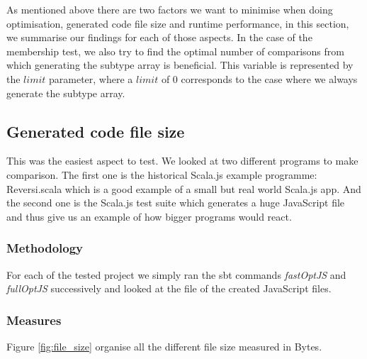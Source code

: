 As mentioned above there are two factors we want to minimise when doing
optimisation, generated code file size and runtime performance, in this
section, we summarise our findings for each of those aspects. In the case of
the membership test, we also try to find the optimal number of comparisons from
which generating the subtype array is beneficial. This variable is represented
by the $limit$ parameter, where a $limit$ of 0 corresponds to the case where we
always generate the subtype array.

\subsection{Generated code file size}
  This was the easiest aspect to test. We looked at two different programs to
make comparison. The first one is the historical Scala.js example programme:
Reversi.scala which is a good example of a small but real world Scala.js app.
And the second one is the Scala.js test suite which generates a huge JavaScript
file and thus give us an example of how bigger programs would react.

\subsubsection{Methodology}
For each of the tested project we simply ran the sbt commands \emph{fastOptJS}
and \emph{fullOptJS} successively and looked at the file of the created
JavaScript files.

\subsubsection{Measures}
Figure \ref{fig:file_size} organise all the different file size measured in
Bytes.

